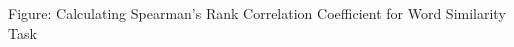 \documentclass[a4paper,12pt]{report}
\begin{document}
Figure: Calculating Spearman's Rank Correlation Coefficient for Word
Similarity Task



\end{document}
